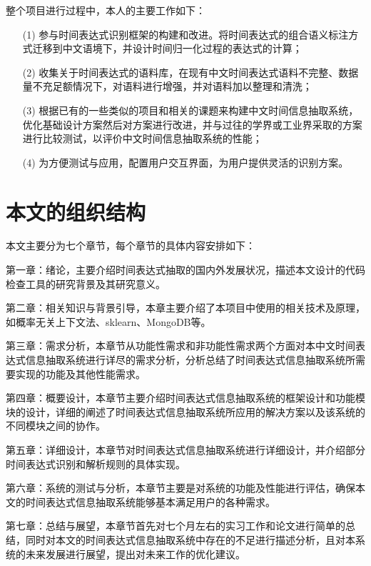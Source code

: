 整个项目进行过程中，本人的主要工作如下：
\begin{enumerate}
    \item[(1)] 参与时间表达式识别框架的构建和改进。将时间表达式的组合语义标注方式迁移到中文语境下，并设计时间归一化过程的表达式的计算；
    \item[(2)] 收集关于时间表达式的语料库，在现有中文时间表达式语料不完整、数据量不充足额情况下，对语料进行增强，并对语料加以整理和清洗；
    \item[(3)] 根据已有的一些类似的项目和相关的课题来构建中文时间信息抽取系统，优化基础设计方案然后对方案进行改进，并与过往的学界或工业界采取的方案进行比较测试，以评价中文时间信息抽取系统的性能；
    \item[(4)] 为方便测试与应用，配置用户交互界面，为用户提供灵活的识别方案。
\end{enumerate}


\section{本文的组织结构}

本文主要分为七个章节，每个章节的具体内容安排如下：

第一章：绪论，主要介绍时间表达式抽取的国内外发展状况，描述本文设计的代码检查工具的研究背景及其研究意义。

第二章：相关知识与背景引导，本章主要介绍了本项目中使用的相关技术及原理，如概率无关上下文法、sklearn、MongoDB等。

第三章：需求分析，本章节从功能性需求和非功能性需求两个方面对本中文时间表达式信息抽取系统进行详尽的需求分析，分析总结了时间表达式信息抽取系统所需要实现的功能及其他性能需求。

第四章：概要设计，本章节主要介绍时间表达式信息抽取系统的框架设计和功能模块的设计，详细的阐述了时间表达式信息抽取系统所应用的解决方案以及该系统的不同模块之间的协作。

第五章：详细设计，本章节对时间表达式信息抽取系统进行详细设计，并介绍部分时间表达式识别和解析规则的具体实现。

第六章：系统的测试与分析，本章节主要是对系统的功能及性能进行评估，确保本文的时间表达式信息抽取系统能够基本满足用户的各种需求。

第七章：总结与展望，本章节首先对七个月左右的实习工作和论文进行简单的总结，同时对本文的时间表达式信息抽取系统中存在的不足进行描述分析，且对本系统的未来发展进行展望，提出对未来工作的优化建议。
